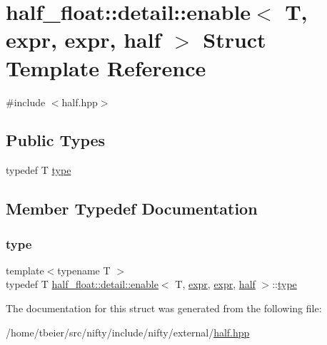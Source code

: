 \hypertarget{structhalf__float_1_1detail_1_1enable_3_01T_00_01expr_00_01expr_00_01half_01_4}{}\section{half\+\_\+float\+:\+:detail\+:\+:enable$<$ T, expr, expr, half $>$ Struct Template Reference}
\label{structhalf__float_1_1detail_1_1enable_3_01T_00_01expr_00_01expr_00_01half_01_4}


{\ttfamily \#include $<$half.\+hpp$>$}

\subsection*{Public Types}
\begin{DoxyCompactItemize}
\item 
typedef T \hyperlink{structhalf__float_1_1detail_1_1enable_3_01T_00_01expr_00_01expr_00_01half_01_4_a9d90de126a82e576c9f3e025c6de7bd3}{type}
\end{DoxyCompactItemize}


\subsection{Member Typedef Documentation}
\mbox{\label{structhalf__float_1_1detail_1_1enable_3_01T_00_01expr_00_01expr_00_01half_01_4_a9d90de126a82e576c9f3e025c6de7bd3}} 
\subsubsection{\texorpdfstring{type}{type}}
{\footnotesize\ttfamily template$<$typename T $>$ \\
typedef T \hyperlink{structhalf__float_1_1detail_1_1enable}{half\+\_\+float\+::detail\+::enable}$<$ T, \hyperlink{structhalf__float_1_1detail_1_1expr}{expr}, \hyperlink{structhalf__float_1_1detail_1_1expr}{expr}, \hyperlink{classhalf__float_1_1half}{half} $>$\+::\hyperlink{structhalf__float_1_1detail_1_1enable_3_01T_00_01expr_00_01expr_00_01half_01_4_a9d90de126a82e576c9f3e025c6de7bd3}{type}}



The documentation for this struct was generated from the following file\+:\begin{DoxyCompactItemize}
\item 
/home/tbeier/src/nifty/include/nifty/external/\hyperlink{half_8hpp}{half.\+hpp}\end{DoxyCompactItemize}

